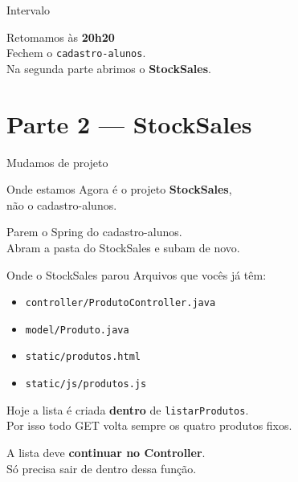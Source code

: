 \documentclass[aspectratio=169,11pt]{beamer}
\newcommand{\onde}[1]{%
  \begin{block}{Onde estamos}
    #1
  \end{block}
}
\begin{document}
\begin{frame}{Intervalo}
  \begin{center}
    \Large Retomamos às \textbf{20h20}\\[0.8em]
    \normalsize
    Fechem o \texttt{cadastro-alunos}.\\
    Na segunda parte abrimos o \textbf{StockSales}.
  \end{center}
\end{frame}

\section{Parte 2 --- StockSales}

\begin{frame}{Mudamos de projeto}
  \onde{Agora é o projeto \textbf{StockSales},\\
        não o cadastro-alunos.}

  Parem o Spring do cadastro-alunos.\\
  Abram a pasta do StockSales e subam de novo.
\end{frame}

\begin{frame}{Onde o StockSales parou}
  Arquivos que vocês já têm:

  \vspace{0.4em}
  \begin{itemize}
    \item \texttt{controller/ProdutoController.java}
    \item \texttt{model/Produto.java}
    \item \texttt{static/produtos.html}
    \item \texttt{static/js/produtos.js}
  \end{itemize}

  \vspace{0.5em}
  Hoje a lista é criada \textbf{dentro} de
  \texttt{listarProdutos}.\\
  Por isso todo GET volta sempre os quatro produtos fixos.

  \vspace{0.4em}
  A lista deve \textbf{continuar no Controller}.\\
  Só precisa sair de dentro dessa função.
\end{frame}
\end{document}
